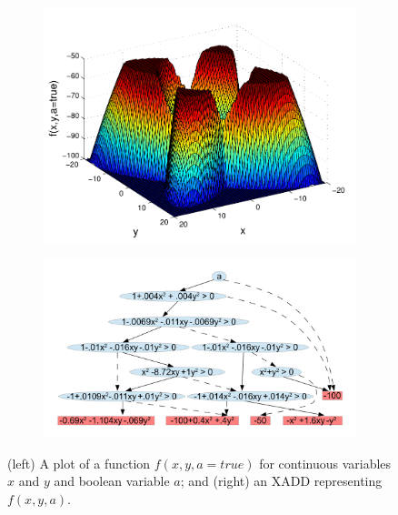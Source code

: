 \begin{figure}[!htb]
    \centering
    \begin{subfigure}[b]{0.2\textwidth}
        \includegraphics[width=\linewidth]{images/quad2.pdf}
    \end{subfigure}
    \begin{subfigure}[b]{0.25\textwidth}
        \includegraphics[width=\linewidth]{images/quad2_xadd5.pdf}
    \end{subfigure}    
    \caption{(left) A plot of a function $f(x, y, a=\mathit{true})$ for continuous variables $x$ and $y$ and boolean variable $a$; and (right) an XADD representing $f(x,y,a)$.}
    \label{fig:xadd}
\end{figure}

